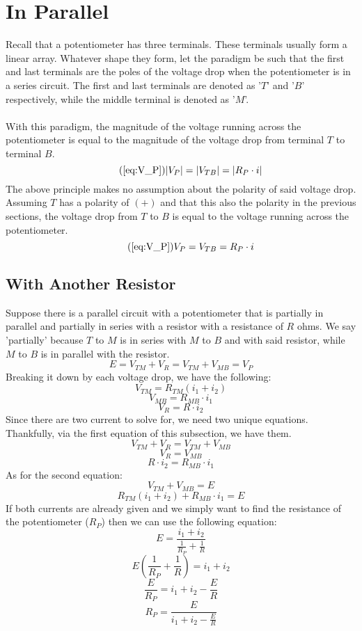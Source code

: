 \documentclass{article}
\begin{document}
	\section[Parallel]{In Parallel}
	Recall that a potentiometer has three terminals.  These terminals usually 
	form a linear array.  Whatever shape they form, let the paradigm be 
	such that the first and last terminals are the poles of the voltage drop 
	when the potentiometer is in a series circuit.  The first and last 
	terminals are denoted as '$T$' and '$B$' respectively, while the middle 
	terminal is denoted as '$M$'. \\ \\
	With this paradigm, the magnitude of the voltage running across the 
	potentiometer is equal to the magnitude of the voltage drop from terminal 
	$T$ to terminal $B$.
	\begin{equation}\tag{\ref{eq:V_P}}
		|V_P| = |V_{TB}| = |R_P \cdot i|
	\end{equation}
	The above principle makes no assumption about the polarity of said voltage 
	drop.  Assuming $T$ has a polarity of $(+)$ and that this also the 
	polarity in the previous sections, the voltage drop from $T$ to $B$ is 
	equal to the voltage running across the potentiometer.
	\begin{equation}\tag{\ref{eq:V_P}}
		V_P = V_{TB} = R_P \cdot i
	\end{equation}
	\subsection[Resistor]{With Another Resistor}
	Suppose there is a parallel circuit with a potentiometer that is partially 
	in parallel and partially in series with a resistor with a resistance of 
	$R$ ohms.  We say 'partially' because $T$ to $M$ is in series with $M$ to 
	$B$ and with said resistor, while $M$ to $B$ is in parallel with the 
	resistor.
	$$ E = V_{TM} + V_R = V_{TM} + V_{MB} = V_P$$
	Breaking it down by each voltage drop, we have the following:
	$$ V_{TM} = R_{TM}(i_1 + i_2)$$
	$$ V_{MB} = R_{MB}\cdot i_1$$
	$$ V_R = R \cdot i_2$$
	Since there are two current to solve for, we need two unique equations.  
	Thankfully, via the first equation of this subsection, we have them.
	$$ V_{TM} + V_R = V_{TM} + V_{MB}$$
	$$ V_R = V_{MB}$$
	$$ R \cdot i_2 = R_{MB} \cdot i_1$$
	As for the second equation:
	$$ V_{TM} + V_{MB} = E$$
	$$ R_{TM}(i_1 + i_2) + R_{MB}\cdot i_1 = E$$
	If both currents are already given and we simply want to find the 
	resistance of the potentiometer ($R_P$) then we can use the following 
	equation:
	$$ E = \frac{i_1 + i_2}{\frac{1}{R_P} + \frac{1}{R}}$$
	$$ E \left(\frac{1}{R_P} + \frac{1}{R} \right) = i_1 + i_2$$
	$$\frac{E}{R_P} = i_1 + i_2 - \frac{E}{R} $$
	$$ R_P = \frac{E}{i_1 + i_2 - \frac{E}{R}}$$
\end{document}
